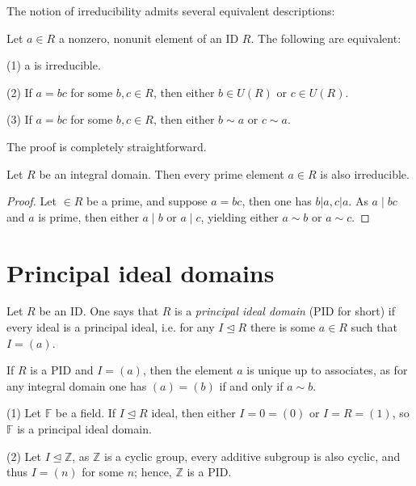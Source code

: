 The notion of irreducibility admits several equivalent descriptions:

\begin{proposition}
    Let $a \in R$ a nonzero, nonunit element of an ID $R$. The following are equivalent:

    (1) a is irreducible.
    
    (2) If $a=b c$ for some $b, c \in R$, then either $b \in U(R)$ or $c \in U(R)$.
    
    (3) If $a=b c$ for some $b, c \in R$, then either $b \sim a$ or $c \sim a$.
\end{proposition} 

The proof is completely straightforward.

\begin{proposition}
    Let $R$ be an integral domain. Then every prime element $a \in R$ is also irreducible.
\end{proposition} 

\begin{proof}
    Let $\in R$ be a prime, and suppose $a=b c$, then one has $b|a, c| a$. As $a \mid b c$ and $a$ is prime, then either $a \mid b$ or $a \mid c$, yielding either $a \sim b$ or $a \sim c$.
\end{proof} 

\section{Principal ideal domains}

\begin{definition}
    Let $R$ be an ID. One says that $R$ is a {\it principal ideal domain} (PID for short) if every ideal is a principal ideal, i.e. for any $I \unlhd R$ there is some $a \in R$ such that $I=(a)$.
\end{definition} 

\begin{remark}
    If $R$ is a PID and $I=(a)$, then the element $a$ is unique up to associates, as for any integral domain one has $(a)=(b)$ if and only if $a \sim b$.
\end{remark} 

\begin{example}
    (1) Let $\mathbb{F}$ be a field. If $I \unlhd R$ ideal, then either $I=0=(0)$ or $I=R=(1)$, so $\mathbb{F}$ is a principal ideal domain.

    (2) Let $I \unlhd \mathbb{Z}$, as $\mathbb{Z}$ is a cyclic group, every additive subgroup is also cyclic, and thus $I=(n)$ for some $n$; hence, $\mathbb{Z}$ is a PID.
\end{example}



